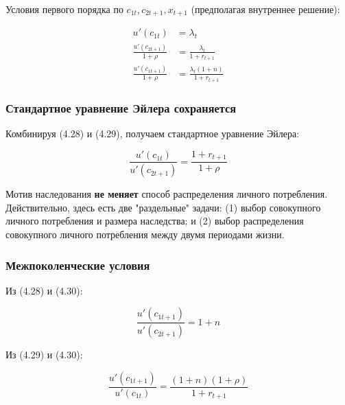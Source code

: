 \documentclass[10pt,a4paper]{article}
\begin{document}
Условия первого порядка по $c_{1t}, c_{2t+1}, x_{t+1}$ (предполагая внутреннее решение):
\begin{formulabox}
\begin{align}
u'(c_{1t}) &= \lambda_t \tag{4.28}\\
\frac{u'(c_{2t+1})}{1+\rho} &= \frac{\lambda_t}{1+r_{t+1}} \tag{4.29}\\
\frac{u'(c_{1t+1})}{1+\rho} &= \frac{\lambda_t(1+n)}{1+r_{t+1}} \tag{4.30}
\end{align}
\end{formulabox}

\subsubsection{Стандартное уравнение Эйлера сохраняется}

Комбинируя (4.28) и (4.29), получаем стандартное уравнение Эйлера:
\begin{formulabox}
\begin{equation}
\frac{u'(c_{1t})}{u'(c_{2t+1})} = \frac{1+r_{t+1}}{1+\rho} \tag{4.5}
\end{equation}
\end{formulabox}

\begin{intuition}
Мотив наследования \textbf{не меняет} способ распределения личного потребления. Действительно, здесь есть две "раздельные" задачи: (1) выбор совокупного личного потребления и размера наследства; и (2) выбор распределения совокупного личного потребления между двумя периодами жизни.
\end{intuition}

\subsubsection{Межпоколенческие условия}

Из (4.28) и (4.30):
\begin{formulabox}
\begin{equation}
\frac{u'(c_{1t+1})}{u'(c_{2t+1})} = 1+n \tag{4.31}
\end{equation}
\end{formulabox}

Из (4.29) и (4.30):
\begin{formulabox}
\begin{equation}
\frac{u'(c_{1t+1})}{u'(c_{1t})} = \frac{(1+n)(1+\rho)}{1+r_{t+1}} \tag{4.32}
\end{equation}
\end{formulabox}
\end{document}
